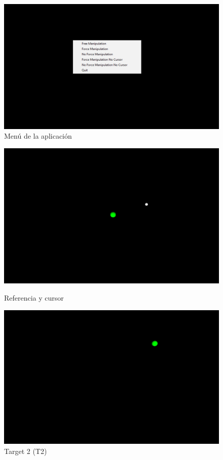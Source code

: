 \documentclass[a4paper,11pt, oneside]{book}
\begin{document}
\begin{figure}[H]
	\centering
	\includegraphics[width=\linewidth]{menu}
	\caption{Menú de la aplicación}
	\label{fig:menu}
\end{figure}
\begin{figure}[H]
	\begin{minipage}[b]{0.5\linewidth}
		\centering
		\includegraphics[width=\linewidth]{cursor}
		\caption{Referencia y cursor}
		\label{fig:cursor}
	\end{minipage}
	\hspace{0.5cm}
	\begin{minipage}[b]{0.5\linewidth}
		\centering
		\includegraphics[width=\linewidth]{T2}
		\caption{Target 2 (T2)}
		\label{fig:t2}
	\end{minipage}
\end{figure}
\end{document}
